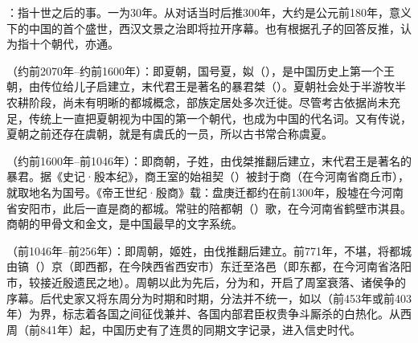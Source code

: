 {
\item {}：指十世之后的事。一为30年。从对话当时后推300年，大约是公元前180年，意义下的中国的首个盛世，西汉文景之治即将拉开序幕。也有根据孔子的回答反推，认为指十个朝代，亦通。

\item {}（约前2070年--约前1600年）：即夏朝，国号夏，姒（），是中国历史上第一个王朝，由传位给儿子启建立，末代君王是著名的暴君桀（）。夏朝社会处于半游牧半农耕阶段，尚未有明晰的都城概念，部族定居处多次迁徙。尽管考古依据尚未充足，传统上一直把夏朝视为中国的第一个朝代，也成为中国的代名词。又有传说，夏朝之前还存在虞朝，就是有虞氏的一员，所以古书常合称虞夏。

（约前1600年--前1046年）：即商朝，子姓，由伐桀推翻后建立，末代君王是著名的暴君。据《史记·殷本纪》，商王室的始祖契（）被封于商（在今河南省商丘市），就取地名为国号。《帝王世纪·殷商》载：盘庚迁都约在前1300年，殷墟在今河南省安阳市，此后一直是商的都城。常驻的陪都朝（）歌，在今河南省鹤壁市淇县。商朝的甲骨文和金文，是中国最早的文字系统。%

（前1046年--前256年）：即周朝，姬姓，由伐推翻后建立。前771年，不堪，将都城由镐（）京（即西都，在今陕西省西安市）东迁至洛邑（即东都，在今河南省洛阳市，较接近殷遗民之地）。周朝以此为先后，分为和，开启了周室衰落、诸侯争的序幕。后代史家又将东周分为时期和时期，分法并不统一，如以（前453年或前403年）为界，标志着各国之间征伐兼并、各国内部君臣权贵争斗厮杀的白热化。从西周（前841年）起，中国历史有了连贯的同期文字记录，进入信史时代。%

}
